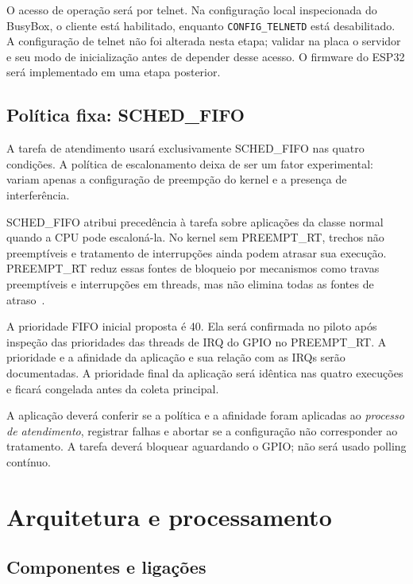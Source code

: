 \documentclass[11pt,a4paper]{article}
\begin{document}
O acesso de operação será por telnet. Na configuração local inspecionada do
BusyBox, o cliente está habilitado, enquanto \texttt{CONFIG\_TELNETD} está
desabilitado. A configuração de telnet não foi alterada nesta etapa; validar
na placa o servidor e seu modo de inicialização antes de depender desse acesso.
O firmware do ESP32 será implementado em uma etapa posterior.

\subsection{Política fixa: SCHED\_FIFO}

A tarefa de atendimento usará exclusivamente SCHED\_FIFO nas quatro condições. A política de escalonamento deixa de ser um fator experimental: variam apenas a configuração de preempção do kernel e a presença de interferência.

SCHED\_FIFO atribui precedência à tarefa sobre aplicações da classe normal quando a CPU pode escaloná-la. No kernel sem PREEMPT\_RT, trechos não preemptíveis e tratamento de interrupções ainda podem atrasar sua execução. PREEMPT\_RT reduz essas fontes de bloqueio por mecanismos como travas preemptíveis e interrupções em threads, mas não elimina todas as fontes de atraso~\cite{rt-theory}.

A prioridade FIFO inicial proposta é 40. Ela será confirmada no piloto após inspeção das prioridades das threads de IRQ do GPIO no PREEMPT\_RT. A prioridade e a afinidade da aplicação e sua relação com as IRQs serão documentadas. A prioridade final da aplicação será idêntica nas quatro execuções e ficará congelada antes da coleta principal.

A aplicação deverá conferir se a política e a afinidade foram aplicadas ao \emph{processo de atendimento}, registrar falhas e abortar se a configuração não corresponder ao tratamento. A tarefa deverá bloquear aguardando o GPIO; não será usado polling contínuo.

\section{Arquitetura e processamento}
\subsection{Componentes e ligações}
\end{document}
